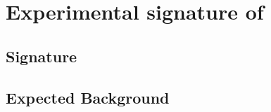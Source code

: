 \chapter[Experimental Signature of \Zprimetotauh]{Experimental signature of \Zprimetotauh}
\label{chap:AnalysisStrategy}


\section{Signature}
\label{sec:Sinal}


\section{Expected Background}
\label{sec:Bkg}